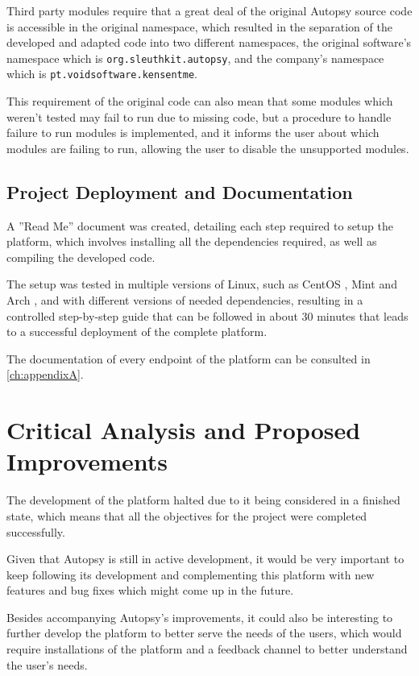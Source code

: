 Third party modules require that a great deal of the original Autopsy source code is accessible in the original namespace, which resulted in the separation of the
developed and adapted code into two different namespaces, the original software's namespace which is \texttt{org.sleuthkit.autopsy}, and the company's namespace which is \texttt{pt.voidsoftware.kensentme}. 

This requirement of the original code can also mean that some modules which weren't tested may fail to run due to missing code, but a procedure to handle failure to run modules is implemented, 
and it informs the user about which modules are failing to run, allowing the user to disable the unsupported modules.

\subsection{Project Deployment and Documentation}

A ''Read Me'' document was created, detailing each step required to setup the platform, which involves installing all the dependencies required, as well as compiling the developed code.

The setup was tested in multiple versions of Linux,  such as CentOS \cite{centos}, Mint \cite{mint} and Arch \cite{arch}, and with different versions of needed dependencies, resulting in a controlled step-by-step guide that can be followed in about 30 minutes that leads to a successful deployment of the complete platform.

The documentation of every endpoint of the platform can be consulted in \autoref{ch:appendixA}.

\section{Critical Analysis and Proposed Improvements}

The development of the platform halted due to it being considered in a finished state, which means that all the objectives for the project were completed successfully.

Given that Autopsy is still in active development, it would be very important to keep following its development and complementing this platform with new features and bug fixes which might come up in the future.

Besides accompanying Autopsy's improvements, it could also be interesting to further develop the platform to better serve the needs of the users, which would require installations of the platform and a feedback channel to better understand the user's needs.
